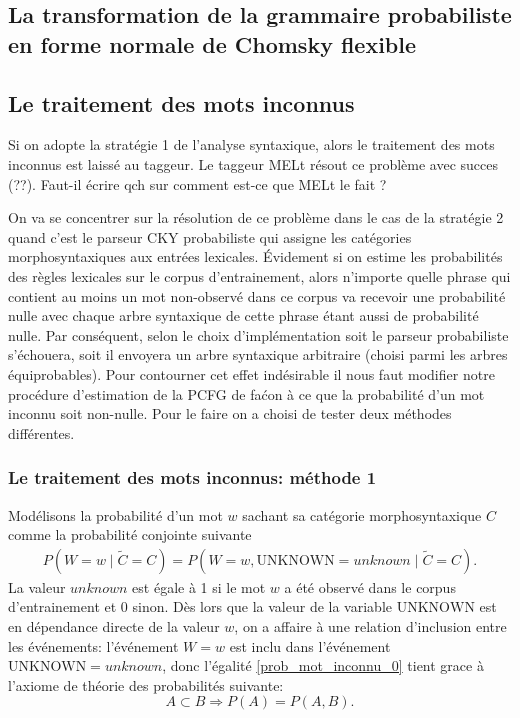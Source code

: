 \documentclass[12pt]{article}
\begin{document}
\subsection{La transformation de la grammaire probabiliste en forme normale de Chomsky flexible}

\subsection{Le traitement des mots inconnus}

Si on adopte la strat\'egie 1 de l'analyse syntaxique, alors le traitement des mots inconnus est laiss\'e au taggeur.
Le taggeur MELt r\'esout ce probl\`eme avec succes (??). Faut-il \'ecrire qch sur comment est-ce que MELt le fait ?

On va se concentrer sur la r\'esolution de ce probl\`eme dans le cas de la strat\'egie 2 quand c'est le parseur CKY probabiliste qui assigne les cat\'egories morphosyntaxiques aux entr\'ees lexicales. \'Evidement si on estime les probabilit\'es des r\`egles lexicales sur le corpus d'entrainement, alors n'importe quelle phrase qui contient au moins un mot non-observ\'e dans ce corpus va recevoir une probabilit\'e nulle avec chaque arbre syntaxique de cette phrase \'etant aussi de probabilit\'e nulle. Par cons\'equent, selon le choix d'impl\'ementation soit le parseur probabiliste s'\'echouera, soit il envoyera un arbre syntaxique arbitraire (choisi parmi les arbres \'equiprobables). Pour contourner cet effet ind\'esirable il nous faut modifier notre proc\'edure d'estimation de la PCFG de fa\'con \`a ce que la probabilit\'e d'un mot inconnu soit non-nulle. Pour le faire on a choisi de tester deux m\'ethodes diff\'erentes.

\subsubsection{Le traitement des mots inconnus: m\'ethode 1}

Mod\'elisons la probabilit\'e d'un mot $w$ sachant sa cat\'egorie morphosyntaxique $C$ comme la probabilit\'e conjointe suivante
\begin{eqnarray}
\label{prob_mot_inconnu_0}
 P(W = w \mid \tilde{C} = C) = P(W = w, \mathrm{UNKNOWN} = unknown \mid \tilde{C} = C).
\end{eqnarray}
La valeur $unknown$ est \'egale \`a 1 si le mot $w$ a \'et\'e observ\'e dans le corpus d'entrainement et 0 sinon. D\`es lors que la valeur de la variable $\mathrm{UNKNOWN}$ est en d\'ependance directe de la valeur $w$,
on a affaire \`a une relation d'inclusion entre les \'ev\'enements: l'\'ev\'enement $W = w$ est inclu dans l'\'ev\'enement $\mathrm{UNKNOWN} = unknown$, donc l'\'egalit\'e \ref{prob_mot_inconnu_0} tient grace \`a l'axiome de th\'eorie des probabilit\'es suivante:
$$ A \subset B \Rightarrow P(A) = P(A,B).$$
\end{document}
